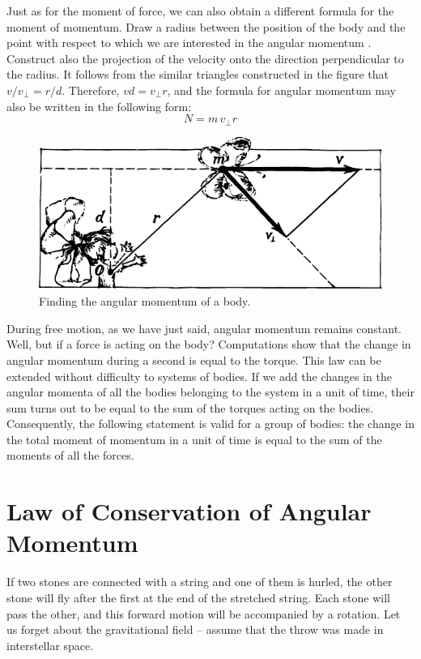 Just as for the moment of force, we can also obtain a different formula for the moment of momentum. Draw a radius between the position of the body and the point with respect to which we are interested in the angular momentum . Construct also the projection of the velocity onto the direction perpendicular to the radius. It follows from the similar triangles constructed in the figure that $v/v_{\perp} = r/d$. Therefore, $vd = v_{\perp}r$, and the formula for angular momentum may also be written in the following form: 
 \begin{equation*}%
N = m \, v_{\perp}r
 \end{equation*}
 \begin{figure}[!ht]
 \centering
 \includegraphics[width=\textwidth]{figures/fig-5-13.pdf}
 \caption{Finding the angular momentum of a body.}
 \label{fig-5-13}
 \end{figure}
 
During free motion, as we have just said, angular momentum remains constant. Well, but if a force is acting on the body? Computations show that the change in angular momentum during a second is equal to the torque. This law can be extended without difficulty to systems of bodies. If we add the changes in the angular momenta of all the bodies belonging to the system in a unit of time, their sum turns out to be equal to the sum of the torques acting on the bodies. Consequently, the following statement is valid for a group of bodies: the change in the total moment of momentum in a unit of time is equal to the sum of the moments of all the forces.

\section{Law of Conservation of Angular Momentum}

If two stones are connected with a string and one of
them is hurled, the other stone will fly after the first at
the end of the stretched string. Each stone will pass the
other, and this forward motion will be accompanied by
a rotation. Let us forget about the gravitational field -- assume that the throw was made in interstellar space.

